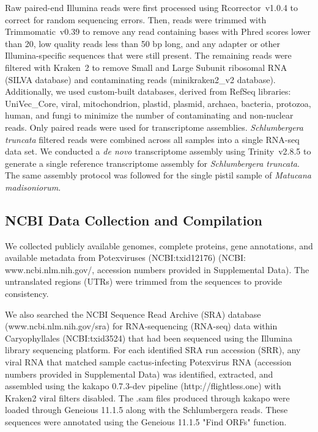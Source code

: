 \documentclass[11pt,letterpaper,titlepage]{article}
\begin{document}
\begin{linenumbers}
Raw paired-end Illumina reads were first processed using \mbox{Rcorrector}~v1.0.4 \cite{song2015} to correct for random sequencing errors.
Then, reads were trimmed with \mbox{Trimmomatic}~v0.39 \cite{bolger2014} to remove any read containing bases with Phred scores lower than 20, low quality reads less than 50 bp long, and any adapter or other Illumina-specific sequences that were still present.
The remaining reads were filtered with \mbox{Kraken}~2 \cite{wood2019} to remove Small and Large Subunit ribosomal RNA (SILVA database) \cite{quast2013} and contaminating reads (minikraken2\_v2 database).
Additionally, we used custom-built databases, derived from RefSeq libraries: UniVec\_Core, viral, mitochondrion, plastid, plasmid, archaea, bacteria, protozoa, human, and fungi to minimize the number of contaminating and non-nuclear reads.
Only paired reads were used for transcriptome assemblies.
\textit{Schlumbergera truncata} filtered reads were combined across all samples into a single RNA-seq data set.
We conducted a \textit{de novo} transcriptome assembly using \mbox{Trinity}~v2.8.5 \cite{grabherr2011} to generate a single reference transcriptome assembly for \textit{Schlumbergera truncata}.
The same assembly protocol was followed for the single pistil sample of \textit{Matucana madisoniorum}.

\subsection*{NCBI Data Collection and Compilation}
We collected publicly available genomes, complete proteins, gene annotations, and available metadata from Potexviruses (NCBI:txid12176) (NCBI: www.ncbi.nlm.nih.gov/, accession numbers provided in Supplemental Data). 
The untranslated regions (UTRs) were trimmed from the sequences to provide consistency.


We also searched the NCBI Sequence Read Archive (SRA) database (www.ncbi.nlm.nih.gov/sra) for RNA-sequencing (RNA-seq) data within Caryophyllales (NCBI:txid3524) that had been sequenced using the Illumina library sequencing platform. 
For each identified SRA run accession (SRR), any viral RNA that matched sample cactus-infecting Potexvirus RNA (accession numbers provided in Supplemental Data) was identified, extracted, and assembled using the kakapo 0.7.3-dev pipeline (http://flightless.one) with Kraken2 viral filters disabled. 
The .sam files produced through kakapo were loaded through Geneious 11.1.5 along with the Schlumbergera reads.
These sequences were annotated using the Geneious 11.1.5 "Find ORFs" function. 


\end{linenumbers}
\end{document}
